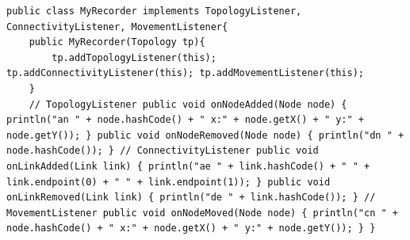 \begin{lstlisting}
public class MyRecorder implements TopologyListener, ConnectivityListener, MovementListener{
	public MyRecorder(Topology tp){
		tp.addTopologyListener(this); tp.addConnectivityListener(this); tp.addMovementListener(this);
	}
	// TopologyListener public void onNodeAdded(Node node) { 	println("an " + node.hashCode() + " x:" + node.getX() + " y:" + node.getY()); } public void onNodeRemoved(Node node) { println("dn " + node.hashCode()); } // ConnectivityListener public void onLinkAdded(Link link) { println("ae " + link.hashCode() + " " + link.endpoint(0) + " " + link.endpoint(1)); } public void onLinkRemoved(Link link) { println("de " + link.hashCode()); } // MovementListener public void onNodeMoved(Node node) { println("cn " + node.hashCode() + " x:" + node.getX() + " y:" + node.getY()); } }
\end{lstlisting}